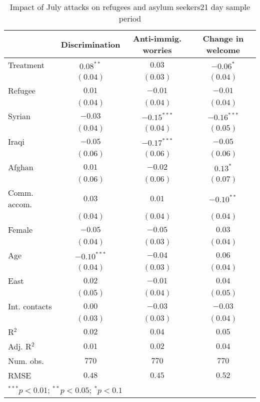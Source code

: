 
\begin{table}
\caption{Impact of July attacks on refugees and asylum seekers21 day sample period}
\begin{center}
\begin{tabular}{l c c c}
\toprule
 & Discrimination & Anti-immig. worries & Change in welcome \\
\midrule
Treatment     & $0.08^{**}$   & $0.03$        & $-0.06^{*}$   \\
              & $(0.04)$      & $(0.03)$      & $(0.04)$      \\
Refugee       & $0.01$        & $-0.01$       & $-0.01$       \\
              & $(0.04)$      & $(0.04)$      & $(0.04)$      \\
Syrian        & $-0.03$       & $-0.15^{***}$ & $-0.16^{***}$ \\
              & $(0.04)$      & $(0.04)$      & $(0.05)$      \\
Iraqi         & $-0.05$       & $-0.17^{***}$ & $-0.05$       \\
              & $(0.06)$      & $(0.06)$      & $(0.06)$      \\
Afghan        & $0.01$        & $-0.02$       & $0.13^{*}$    \\
              & $(0.06)$      & $(0.06)$      & $(0.07)$      \\
Comm. accom.  & $0.03$        & $0.01$        & $-0.10^{**}$  \\
              & $(0.04)$      & $(0.04)$      & $(0.04)$      \\
Female        & $-0.05$       & $-0.05$       & $0.03$        \\
              & $(0.04)$      & $(0.03)$      & $(0.04)$      \\
Age           & $-0.10^{***}$ & $-0.04$       & $0.06$        \\
              & $(0.04)$      & $(0.03)$      & $(0.04)$      \\
East          & $0.02$        & $-0.01$       & $0.04$        \\
              & $(0.05)$      & $(0.04)$      & $(0.05)$      \\
Int. contacts & $0.00$        & $-0.03$       & $-0.03$       \\
              & $(0.03)$      & $(0.03)$      & $(0.04)$      \\
\midrule
R$^2$         & $0.02$        & $0.04$        & $0.05$        \\
Adj. R$^2$    & $0.01$        & $0.02$        & $0.04$        \\
Num. obs.     & $770$         & $770$         & $770$         \\
RMSE          & $0.48$        & $0.45$        & $0.52$        \\
\bottomrule
\multicolumn{4}{l}{\scriptsize{$^{***}p<0.01$; $^{**}p<0.05$; $^{*}p<0.1$}}
\end{tabular}
\label{tab_host_z_mcs}
\end{center}
\end{table}
